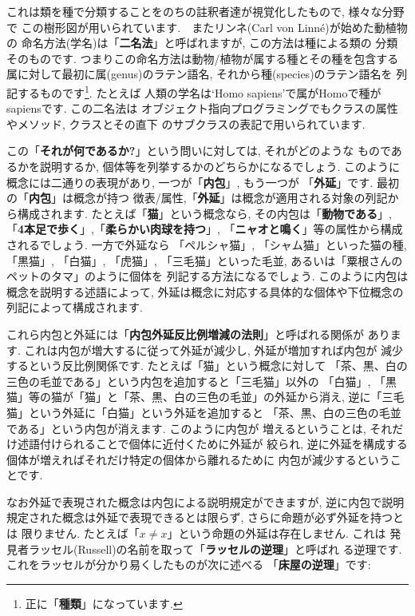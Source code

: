 これは類を種で分類することをのちの註釈者達が視覚化したもので, 様々な分野で
この樹形図が用いられています.　またリンネ(Carl von Linn\'e)が始めた動植物の
命名方法(学名)は「\textbf{二名法}」と呼ばれますが, この方法は種による類の
分類そのものです. つまりこの命名方法は動物/植物が属する種とその種を包含する
属に対して最初に属(genus)のラテン語名, それから種(species)のラテン語名を
列記するものです\footnote{正に「\textbf{種類}」になっています.}. たとえば
人類の学名は`Homo sapiens'で属がHomoで種がsapiensです. この二名法は
オブジェクト指向プログラミングでもクラスの属性やメソッド, クラスとその直下
のサブクラスの表記で用いられています.
\newline


この「\textbf{それが何であるか?}」という問いに対しては, それがどのような
ものであるかを説明するか, 個体等を列挙するかのどちらかになるでしょう.
 このように概念には二通りの表現があり, 一つが「\textbf{内包}」, もう一つが
「\textbf{外延}」です. 最初の「\textbf{内包}」は概念が持つ
徴表/属性,「\textbf{外延}」は概念が適用される対象の列記から構成されます.
 たとえば「\textbf{猫}」という概念なら, その内包は「\textbf{動物である}」,
 「\textbf{4本足で歩く}」,「\textbf{柔らかい肉球を持つ}」,
 「\textbf{ニャオと鳴く}」等の属性から構成されるでしょう. 一方で外延なら
 「ペルシャ猫」, 「シャム猫」といった猫の種, 「黒猫」, 「白猫」, 「虎猫」,
 「三毛猫」といった毛並, あるいは「粟根さんのペットのタマ」のように個体を
列記する方法になるでしょう. このように内包は概念を説明する述語によって,
 外延は概念に対応する具体的な個体や下位概念の列記によって構成されます.
\newline


これら内包と外延には「\textbf{内包外延反比例増減の法則}」と呼ばれる関係が
あります. これは内包が増大するに従って外延が減少し, 外延が増加すれば内包が
減少するという反比例関係です. たとえば「猫」という概念に対して
「茶、黒、白の三色の毛並である」という内包を追加すると「三毛猫」以外の
「白猫」, 「黒猫」等の猫が「猫」と「茶、黒、白の三色の毛並」の外延から消え,
 逆に「三毛猫」という外延に「白猫」という外延を追加すると
「茶、黒、白の三色の毛並である」という内包が消えます. このように内包が
増えるということは, それだけ述語付けられることで個体に近付くために外延が
絞られ, 逆に外延を構成する個体が増えればそれだけ特定の個体から離れるために
内包が減少するということです.
\newline

なお外延で表現された概念は内包による説明規定ができますが, 逆に内包で説明
規定された概念は外延で表現できるとは限らず, さらに命題が必ず外延を持つとは
限りません. たとえば「$x \neq x$」という命題の外延は存在しません. これは
発見者ラッセル(Russell)の名前を取って「\textbf{ラッセルの逆理}」と呼ばれ
る逆理です. これをラッセルが分かり易くしたものが次に述べる
「\textbf{床屋の逆理}」です:

